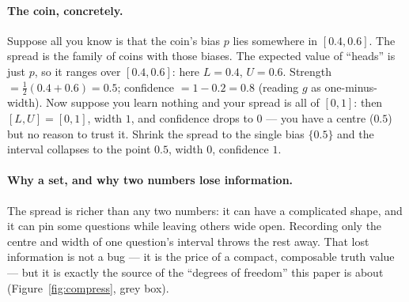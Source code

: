 \documentclass[]{article}
\begin{document}
\paragraph{The coin, concretely.} Suppose all you know is that the coin's bias
$p$ lies somewhere in $[0.4,0.6]$. The spread is the family of coins with those
biases. The expected value of ``heads'' is just $p$, so it ranges over
$[0.4,0.6]$: here $L=0.4$, $U=0.6$. Strength $=\tfrac12(0.4+0.6)=0.5$;
confidence $=1-0.2=0.8$ (reading $g$ as one-minus-width). Now suppose you learn
nothing and
your spread is all of $[0,1]$: then $[L,U]=[0,1]$, width $1$, and confidence
drops to $0$ --- you have a centre ($0.5$) but no reason to trust it. Shrink the
spread to the single bias $\{0.5\}$ and the interval collapses to the point
$0.5$, width $0$, confidence $1$.

\paragraph{Why a set, and why two numbers lose information.} The spread is
richer than any two numbers: it can have a complicated shape, and it can pin
some questions while leaving others wide open. Recording only the centre and
width of one question's interval throws the rest away. That lost information is
not a bug --- it is the price of a compact, composable truth value --- but it is
exactly the source of the ``degrees of freedom'' this paper is about
(Figure~\ref{fig:compress}, grey box).
\end{document}
